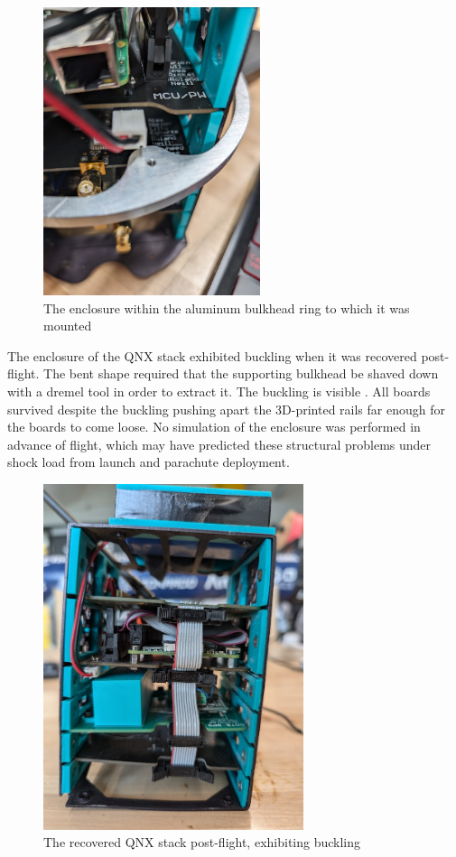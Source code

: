 \begin{figure}[H]
    \center
    \includegraphics[width=2.5in]{assets/images/stack-bulkhead.jpg}
    \caption{The enclosure within the aluminum bulkhead ring to which it was mounted}
    \label{fig:stack-bulkhead}
\end{figure}

The enclosure of the QNX stack exhibited buckling when it was recovered post-flight. The bent shape required that the
supporting bulkhead be shaved down with a dremel tool in order to extract it. The buckling is visible
. All boards survived despite the buckling pushing apart the 3D-printed rails far enough for the
boards to come loose. No simulation of the enclosure was performed in advance of flight, which may have predicted these
structural problems under shock load from launch and parachute deployment.

\begin{figure}[H]
    \center
    \includegraphics[width=3in]{assets/images/bent-stack.jpg}
    \caption{The recovered QNX stack post-flight, exhibiting buckling}
    \label{fig:stack-bent}
\end{figure}

